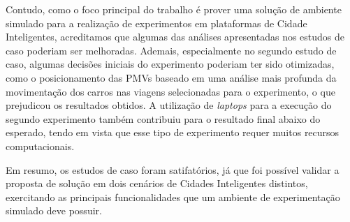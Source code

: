 Contudo, como o foco principal do trabalho é prover uma solução de ambiente simulado para a realização de experimentos em plataformas de Cidade Inteligentes, acreditamos que algumas das análises
apresentadas nos estudos de caso poderiam ser melhoradas.
Ademais, especialmente no segundo estudo de caso, algumas decisões iniciais do experimento poderiam ter sido otimizadas, como o posicionamento das PMVs baseado em uma análise mais profunda da movimentação
dos carros nas viagens selecionadas para o experimento, o que prejudicou os resultados obtidos.
A utilização de \textit{laptops} para a execução do segundo experimento também contribuiu para o resultado final abaixo do esperado, tendo em vista que esse tipo de experimento requer muitos recursos
computacionais.

Em resumo, os estudos de caso foram satifatórios, já que foi possível validar a proposta de solução em dois cenários de Cidades Inteligentes distintos, exercitando as principais funcionalidades que
um ambiente de experimentação simulado deve possuir.


